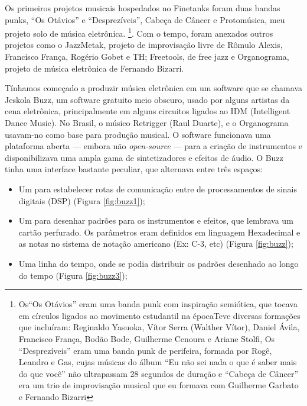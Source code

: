    
Os primeiros projetos musicais hospedados no Finetanks foram duas bandas punks, ``Os Otávios'' e ``Desprezíveis'', Cabeça de Câncer e Protomúsica, meu projeto solo de música eletrônica. \footnote{Os``Os Otávios'' eram uma banda punk com inspiração semiótica, que tocava em círculos ligados ao movimento estudantil na épocaTeve diversas formações que incluíram: Reginaldo Yasuoka, Vítor Serra (Walther Vítor), Daniel Ávila, Francisco França, Bodão Bode, Guilherme Cenoura e Ariane Stolfi, Os ``Desprezíveis'' eram uma banda punk de perifeira, formada por Rogê, Leandro e Gas, cujas músicas do álbum ``Eu não sei nada o que é saber mais do que você'' não ultrapassam 28 segundos de duração e ``Cabeça de Câncer'' era um trio de improvisação musical que eu formava com Guilherme Garbato e Fernando Bizarri}. Com o tempo, foram anexados outros projetos como o JazzMetak, projeto de improvisação livre de Rômulo Alexis, Francisco França, Rogério Gobet e TH; Freetools, de free jazz e Organograma, projeto de música eletrônica de Fernando Bizarri.

Tínhamos começado a produzir música eletrônica em um software que se chamava Jeskola Buzz, um software gratuito meio obscuro, usado por alguns artistas da cena eletrônica, principalmente em alguns circuitos ligados ao IDM (Intelligent Dance Music). No Brasil, o músico Retrigger (Raul Duarte), e o Organograma usavam-no como base para produção musical. O software funcionava uma plataforma aberta --- embora não \emph{open-source} --- para a criação de instrumentos e disponibilizava uma ampla gama de sintetizadores e efeitos de áudio. O Buzz tinha uma interface bastante peculiar, que alternava entre três espaços:

\begin{itemize}
\item Um para estabelecer rotas de comunicação entre de processamentos de sinais digitais (DSP) (Figura \ref{fig:buzz1});
\item Um para desenhar padrões para os instrumentos e efeitos, que lembrava um cartão perfurado. Os parâmetros eram definidos em linguagem Hexadecimal e as notas no sistema de notação americano (Ex: C-3, etc) (Figura \ref{fig:buzz});
\item Uma linha do tempo, onde se podia distribuir os padrões desenhado ao longo do tempo (Figura \ref{fig:buzz3});
\end{itemize}


